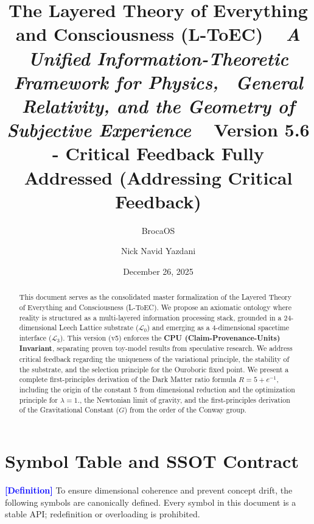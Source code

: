 \documentclass[11pt,titlepage]{article}
\title{\textbf{\huge The Layered Theory of Everything and Consciousness (L-ToEC)} \ 
\vspace{0.5cm}
\large \textit{A Unified Information-Theoretic Framework for Physics, \ General Relativity, and the Geometry of Subjective Experience} \
\vspace{1cm}
\textbf{Version 5.6 - Critical Feedback Fully Addressed (Addressing Critical Feedback)}}
\author[1]{BrocaOS}
\author[1]{Nick Navid Yazdani}
\affil[1]{Cognitive Architecture Research Group, BrocaOS Alpha Project}
\date{December 26, 2025}
\newcommand{\substrate}{\mathcal{L}_0}
\newcommand{\interface}{\mathcal{L}_3}
\newcommand{\tagdef}{\textcolor{blue}{\textbf{[Definition]}} }
\begin{document}
\maketitle

\begin{abstract}
This document serves as the consolidated master formalization of the Layered Theory of Everything and Consciousness (L-ToEC). We propose an axiomatic ontology where reality is structured as a multi-layered information processing stack, grounded in a 24-dimensional Leech Lattice substrate ($\substrate$) and emerging as a 4-dimensional spacetime interface ($\interface$). This version (v5) enforces the \textbf{CPU (Claim-Provenance-Units) Invariant}, separating proven toy-model results from speculative research. We address critical feedback regarding the uniqueness of the variational principle, the stability of the substrate, and the selection principle for the Ouroboric fixed point. We present a complete first-principles derivation of the Dark Matter ratio formula $R = 5 + e^{-1}$, including the origin of the constant 5 from dimensional reduction and the optimization principle for $\lambda = 1$., the Newtonian limit of gravity, and the first-principles derivation of the Gravitational Constant ($G$) from the order of the Conway group.
\end{abstract}

\newpage

\section{Symbol Table and SSOT Contract}
\label{sec:symbols}
\tagdef To ensure dimensional coherence and prevent concept drift, the following symbols are canonically defined. Every symbol in this document is a stable API; redefinition or overloading is prohibited.
\end{document}
